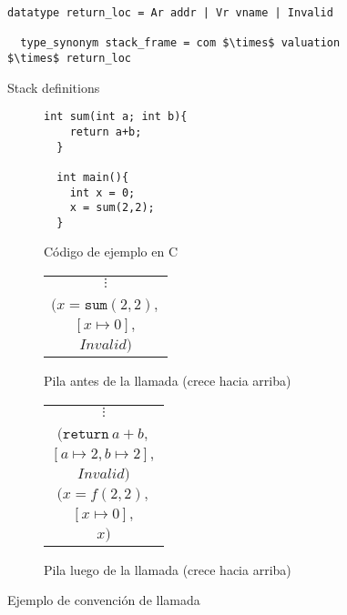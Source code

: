 \begin{figure}
  \begin{lstlisting}[frame=single, mathescape=true]
  datatype return_loc = Ar addr | Vr vname | Invalid

  type_synonym stack_frame = com $\times$ valuation $\times$ return_loc
  \end{lstlisting}

  \caption{Stack definitions}
  \label{fig:stack_def}
\end{figure}

\begin{figure}
\centering
  \begin{subfigure}{0.3\textwidth}
  \begin{lstlisting}[mathescape=true]
  int sum(int a; int b){
    return a+b;
  }

  int main(){
    int x = 0;
    x = sum(2,2);
  }
  \end{lstlisting}
  \caption{Código de ejemplo en C}
  \label{fig:stack_ex_c_code}
  \end{subfigure}
  \begin{subfigure}{0.3\textwidth}
  \centering
    \begin{tabular}{|c|}
      \hline
      \hline
      $\vdots$ \\
      \\
      \hline
      $(x = \mathtt{sum}(2,2),$ \\
      $[x \mapsto 0],$ \\
      $ Invalid )$ \\
      \hline \hline
    \end{tabular}
  \caption{Pila antes de la llamada (crece hacia arriba)}
  \label{fig:stack_bef_fun_call}
  \end{subfigure}
  \begin{subfigure}{0.3\textwidth}
    \begin{tabular}{|c|}
      \hline
      \hline
      $\vdots$ \\
      \\
      \hline
      $(\mathtt{return}\ a+b,$ \\
      $[a \mapsto 2, b \mapsto 2],$ \\
      $ Invalid )$ \\
      \hline
      $(x = f(2,2),$ \\
      $[x \mapsto 0],$ \\
      $ x )$ \\
      \hline \hline
    \end{tabular}
  \caption{Pila luego de la llamada (crece hacia arriba)}
  \label{fig:stack_aft_fun_call}
  \end{subfigure}

  \caption{Ejemplo de convención de llamada}
  \label{fig:stack_example}
\end{figure}

